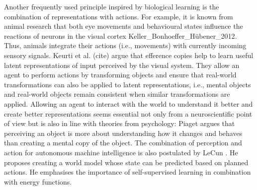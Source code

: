 Another frequently used principle inspired by biological learning is the combination of representations with actions. For example, it is known from animal research that both eye movements and behavioural states influence the reactions of neurons in the visual cortex {Keller_Bonhoeffer_Hübener_2012}.
Thus, animals integrate their actions (i.e., movements) with currently incoming sensory signals.
Keurti et al. (cite) argue that efference copies help to learn useful latent representations of input perceived by the visual system. They allow an agent to perform actions by transforming objects and ensure that real-world transformations can also be applied to latent representations, i.e., mental objects and real-world objects remain consistent when similar transformations are applied.
Allowing an agent to interact with the world to understand it better and create better representations seems essential not only from a neuroscientific point of view but is also in line with theories from psychology:
Piaget argues that perceiving an object is more about understanding how it changes and behaves than creating a mental copy of the object.
The combination of perception and action for autonomous machine intelligence is also postulated by LeCun . He proposes creating a world model whose state can be predicted based on planned actions. He emphasises the importance of self-supervised learning in combination with energy functions.

